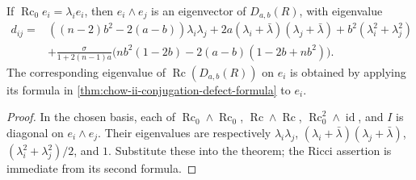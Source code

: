 \begin{corollary}
  \label{cor:chow-ii-conjugation-defect-eigenvalues}
  If \(\operatorname{Rc}_0e_i=\lambda_i e_i\), then \(e_i\wedge e_j\) is an
  eigenvector of \(D_{a,b}(R)\), with eigenvalue
  \[
  \begin{aligned}
  d_{ij}={}&((n-2)b^2-2(a-b))\lambda_i\lambda_j
   +2a(\lambda_i+\bar\lambda)(\lambda_j+\bar\lambda)
   +b^2(\lambda_i^2+\lambda_j^2)\\
   &+\frac{\sigma}{1+2(n-1)a}
   \bigl(nb^2(1-2b)-2(a-b)(1-2b+nb^2)\bigr).
  \end{aligned}
  \]
  The corresponding eigenvalue of \(\operatorname{Rc}(D_{a,b}(R))\) on
  \(e_i\) is obtained by applying its formula in
  \ref{thm:chow-ii-conjugation-defect-formula} to \(e_i\).
\end{corollary}
\begin{proof}
  In the chosen basis, each of
  \(\operatorname{Rc}_0\wedge\operatorname{Rc}_0\),
  \(\operatorname{Rc}\wedge\operatorname{Rc}\),
  \(\operatorname{Rc}_0^2\wedge\operatorname{id}\), and \(I\) is diagonal on
  \(e_i\wedge e_j\).  Their eigenvalues are respectively
  \(\lambda_i\lambda_j\),
  \((\lambda_i+\bar\lambda)(\lambda_j+\bar\lambda)\),
  \((\lambda_i^2+\lambda_j^2)/2\), and \(1\).  Substitute these into the
  theorem; the Ricci assertion is immediate from its second formula.
\end{proof}
